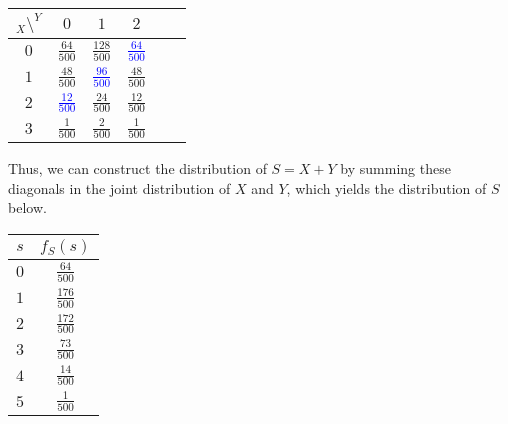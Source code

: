 \begin{examp}
\begin{center}
\renewcommand{\arraystretch}{1.5}
\begin{tabular}{c|ccccc}
$_{X} \setminus ^Y$ & $0$ & $1$ & $2$ \\
\hline
$0$ & $\frac{64}{500}$ & $\frac{128}{500}$ & \textcolor{blue}{$\frac{64}{500}$} \\
$1$ & $\frac{48}{500}$ & \textcolor{blue}{$\frac{96}{500}$} & $\frac{48}{500}$ \\
$2$ & \textcolor{blue}{$\frac{12}{500}$} & $\frac{24}{500}$ & $\frac{12}{500}$ \\
$3$ & $\frac{1}{500}$ & $\frac{2}{500}$ & $\frac{1}{500}$ \\
\end{tabular}
\end{center}
Thus, we can construct the distribution of $S = X + Y$ by summing these diagonals in the joint distribution of $X$ and $Y$, which yields the distribution of $S$ below.

\begin{center}
\begin{minipage}{0.2\textwidth}
\centering
\renewcommand{\arraystretch}{1.5}
\begin{tabular}{c|c}
$s$ & $f_S(s)$ \\
\hline
$0$ & $\frac{64}{500}$ \\
$1$ & $\frac{176}{500}$ \\
$2$ & $\frac{172}{500}$ \\
$3$ & $\frac{73}{500}$ \\
$4$ & $\frac{14}{500}$ \\
$5$ & $\frac{1}{500}$ \\
\end{tabular}
\renewcommand{\arraystretch}{1}
\end{minipage}\begin{minipage}{0.6\textwidth}
\centering
\vspace*{0.2in}
\end{minipage}
\end{center}
\end{examp}


